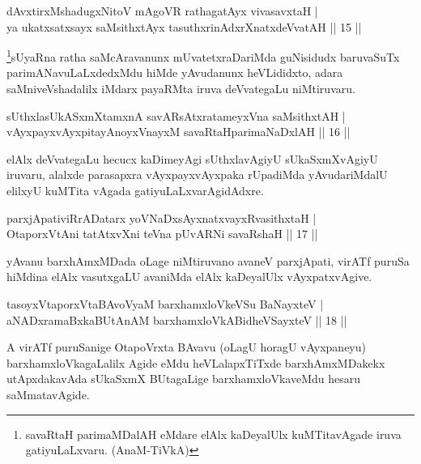 \begin{shl}
dAvxtirxMshadugxNitoV mAgoVR rathagatAyx vivasavxtaH |\\
ya ukatxsatxsayx saMsithxtAyx tasuthxrinAdxrXnatxdeVvatAH \hfill || 15 ||
\end{shl}

\begin{artha}
\footnote[1]{savaRtaH parimaMDalAH eMdare elAlx kaDeyalUlx kuMTitavAgade iruva gatiyuLaLxvaru. (AnaM-TiVkA)}sUyaRna ratha saMcAravanunx mUvatetxraDariMda guNisidudx baruvaSuTx parimANavuLaLxdedxMdu hiMde yAvudanunx heVLididxto, adara saMniveVshadalilx iMdarx payaRMta iruva deVvategaLu niMtiruvaru.
\end{artha}

\begin{shl}
sUthxlasUkASxmXtamxnA savARsAtxratameyxVna saMsithxtAH |\\
vAyxpayxvAyxpitayA\s noyxVnayxM savaRtaHparimaNaDxlAH \hfill || 16 ||
\end{shl}

\begin{artha}
elAlx deVvategaLu hecucx kaDimeyAgi sUthxlavAgiyU sUkaSxmXvAgiyU iruvaru, alalxde parasapxra vAyxpayxvAyxpaka rUpadiMda yAvudariMdalU elilxyU kuMTita vAgada gatiyuLaLxvarAgidAdxre.
\end{artha}


\begin{shl}
parxjApativiRrADatarx yoV\s NaDxsAyxnatxvayxRvasithxtaH |\\
OtaporxVtAni tatAtxvXni teVna pUvARNi savaRshaH \hfill || 17 ||
\end{shl}

\begin{artha}
yAvanu barxhAmxMDada oLage niMtiruvano avaneV parxjApati, virATf puruSa hiMdina elAlx vasutxgaLU avaniMda elAlx kaDeyalUlx vAyxpatxvAgive.
\end{artha}

\begin{shl}
tasoyxVtaporxVtaBAvoV\s yaM barxhamxloVkeVSu BaNayxteV |\\
aNADxramaBxkaBUtAnAM barxhamxloVkABidheVSayxteV \hfill || 18 ||
\end{shl}

\begin{artha}
A virATf puruSanige OtapoVrxta BAvavu (oLagU horagU vAyxpaneyu) barxhamxloVkagaLalilx Agide eMdu heVLalapxTiTxde barxhAmxMDakekx utApxdakavAda sUkaSxmX BUtagaLige barxhamxloVkaveMdu hesaru saMmatavAgide.
\end{artha}

